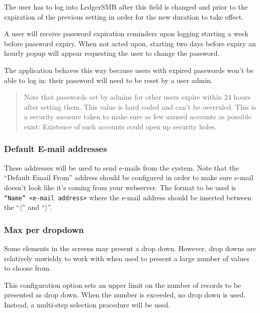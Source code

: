 The user has to log into LedgerSMB after this field is changed and prior to the expiration of the previous setting in order for the new duration to take effect.

A user will receive password  expiration reminders upon logging starting a week before password
expiry. When not acted upon, starting two days before expiry an hourly popup will appear
requesting the user to change the password.

The application behaves this way because users with expired passwords won't be able to log in:
their password will need to be reset by a user admin.

\begin{quote}
Note that passwords set by admins for other users expire  within 24 hours after setting them.
This value is hard coded and can't be overruled. This is a security measure taken to make
sure as few unused accounts as possible exist: Existence of such accounts could open up security
holes.
\end{quote}


\subsubsection{Default E-mail addresses}
\label{subsubsec-company-config-defaults-email}

These addresses will be used to send e-mails  from the system.
Note that the ``Default Email From'' address should be configured in order to make sure
e-mail doesn't look like it's coming from your webserver. The format to be used is \texttt{``Name'' <e-mail address>} where the e-mail address should be inserted between the
``$\langle$'' and ``$\rangle$''.

\subsubsection{Max per dropdown}
\label{subsubsec-company-config-defaults-max-dropdown}

Some elements in the screens may present a drop down. However, drop downs are
relatively unwieldy to work with when used to present a large number of values
to choose from.

This configuration option sets an upper limit on the number of records to be
presented as drop down.  When the number is exceeded, no drop down is used.  Instead,
a multi-step selection procedure will be used.

